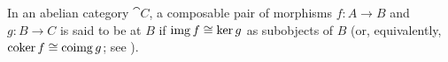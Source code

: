 \begin{definition}\label{def:exact_morphism_pair}\mcite\cite[196]{MacLane1994}
  In an abelian category \( \cat{C} \), a composable pair of morphisms \( f: A \to B \) and \( g: B \to C \) is said to be  at \( B \) if \( \operatorname{img} f \cong \ker g \) as subobjects of \( B \) (or, equivalently, \( \operatorname*{co\!\ker} f \cong \operatorname*{co\!\operatorname{img}} g \); see ).
\end{definition}

